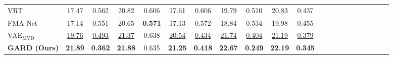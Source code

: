 \begin{table}[t]
{\begin{tabular}{lccccc ccccc ccccc ccccc}
VRT~\cite{liang2024vrt}
& 17.47  &    0.562
& 20.82  &    0.606
& 17.61  &    0.606
& 19.79  &    0.510
& 20.83  &     0.437
\\

FMA-Net~\cite{Youk_2024_CVPR}
& 17.14 &   0.551
& 20.65 &   \textbf{0.571}
& 17.13 & 0.572
& 18.84 & 0.534
& 19.98 & 0.455
\\



VAE$_\text{MVD}$
&    \underline{19.76}	&   \underline{0.493}
&     \underline{21.37}	&   0.638
&    \underline{20.54}	&  \underline{0.434}
&     \underline{21.74}	&   \underline{0.404}
&    \underline{21.19}	&  \underline{0.379} \\


\textbf{GARD (Ours)}
& \textbf{21.89}	& \textbf{0.362}
& \textbf{21.88}	& {0.635}
& \textbf{21.25} & \textbf{0.418}
& \textbf{22.67} &	\textbf{0.249}
& \textbf{22.19} & \textbf{0.345} \\

\bottomrule
\end{tabular}
}
\end{table}